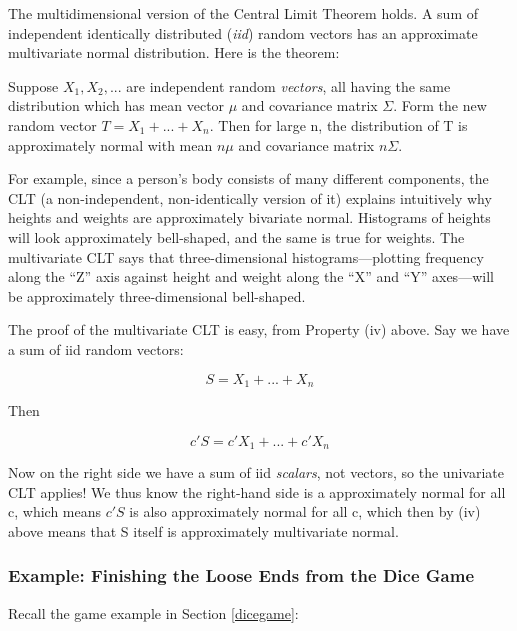 The multidimensional version of the Central Limit Theorem holds.  A sum
of independent identically distributed ({\it iid}) random vectors has an
approximate multivariate normal distribution.  Here is the theorem:

\begin{theorem}

Suppose $X_1, X_2, ...$ are independent random {\it vectors}, all having
the same distribution which has mean vector $\mu$ and covariance matrix
$\Sigma$.  Form the new random vector $T = X_1+...+X_n$.  Then for large
n, the distribution of T is approximately normal with mean $n \mu$ and
covariance matrix $n \Sigma$.

\end{theorem}


For example, since a person's body consists of many different
components, the CLT (a non-independent, non-identically version of it)
explains intuitively why heights and weights are approximately bivariate
normal.  Histograms of heights will look approximately bell-shaped, and
the same is true for weights.  The multivariate CLT says that
three-dimensional histograms---plotting frequency along the ``Z'' axis
against height and weight along the ``X'' and ``Y'' axes---will be
approximately three-dimensional bell-shaped.

The proof of the multivariate CLT is easy, from Property (iv) above.
Say we have a sum of iid random vectors:

\begin{equation}
S = X_1 + ... + X_n
\end{equation}

Then 

\begin{equation}
c'S = c'X_1 + ... + c'X_n
\end{equation}

Now on the right side we have a sum of iid {\it scalars}, not vectors,
so the univariate CLT applies!  We thus know the right-hand side is a
approximately normal for all c, which means $c'S$ is also approximately
normal for all c, which then by (iv) above means that S itself is
approximately multivariate normal.

\subsubsection{Example:  Finishing the Loose Ends from the Dice Game}

Recall the game example in Section \ref{dicegame}:

